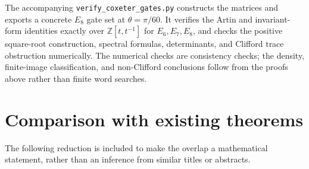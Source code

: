 \documentclass[11pt,a4paper]{article}
\theoremstyle{remark}\newtheorem{remark}[theorem]{Remark}
\begin{document}
The accompanying \texttt{verify\_coxeter\_gates.py} constructs the
matrices and exports a concrete $E_8$ gate set at $\theta=\pi/60$.
It verifies the Artin and invariant-form identities exactly over
$\mathbb Z[t,t^{-1}]$ for $E_6,E_7,E_8$, and checks the positive
square-root construction, spectral formulas, determinants, and Clifford
trace obstruction numerically.  The numerical checks are consistency
checks; the density, finite-image classification, and non-Clifford
conclusions follow from the proofs above rather than finite word searches.


\section{Comparison with existing theorems}\label{sec:overlap}
The following reduction is included to make the overlap a mathematical
statement, rather than an inference from similar titles or abstracts.
\end{document}
